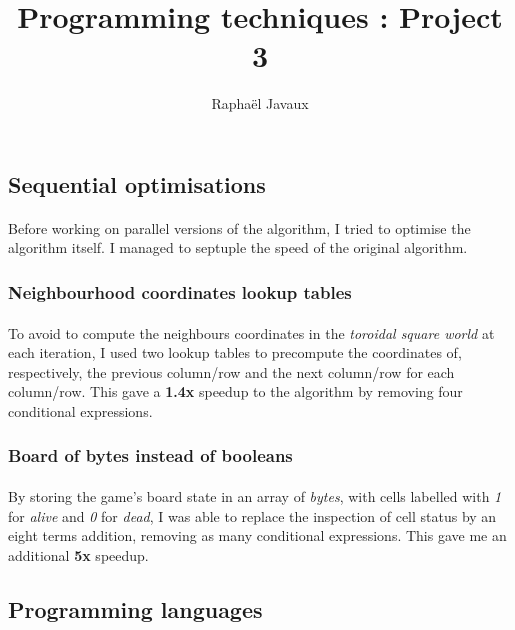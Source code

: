 \documentclass[a4paper]{article}
\title{Programming techniques : Project 3}
\author{Raphaël Javaux}
\date{}
\begin{document}
\maketitle

   \subsection{Sequential optimisations}

    \paragraph{}Before working on parallel versions of the algorithm, I tried to
optimise the algorithm itself. I managed to septuple the speed of the original
algorithm.

   \subsubsection{Neighbourhood coordinates lookup tables}

    \paragraph{}To avoid to compute the neighbours coordinates in the
\textit{toroidal square world} at each iteration, I used two lookup tables to
precompute the coordinates of, respectively, the previous column/row and the
next column/row for each column/row. This gave a \textbf{1.4x} speedup to the
algorithm by removing four conditional expressions.

   \subsubsection{Board of bytes instead of booleans}

   \paragraph{}By storing the game's board state in an array of \textit{bytes},
with cells labelled with \textit{1} for \textit{alive} and \textit{0} for
\textit{dead}, I was able to replace the inspection of cell status by an eight
terms addition, removing as many conditional expressions. This gave me an
additional \textbf{5x} speedup.

  \subsection{Programming languages}
\end{document}
